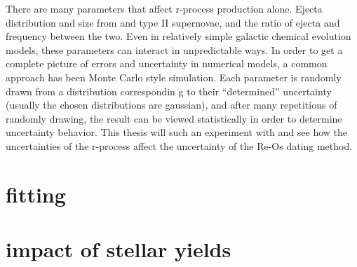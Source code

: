 There are many parameters that affect r-process production alone. Ejecta distribution and size from \nsm and type II supernovae, and the ratio of ejecta and frequency between the two. Even in relatively simple galactic chemical evolution models, these parameters can interact in unpredictable ways. In order to get a complete picture of errors and uncertainty in numerical models, a common approach has been Monte Carlo style simulation. Each parameter is randomly drawn from a distribution correspondin g to their ``determined'' uncertainty (usually the chosen distributions are gaussian), and after many repetitions of randomly drawing, the result can be viewed statistically in order to determine uncertainty behavior.
This thesis will such an experiment with  and see how the uncertainties of the r-process affect the uncertainty of the Re-Os dating method.

\section{fitting}

\section{impact of stellar yields}


\fi
